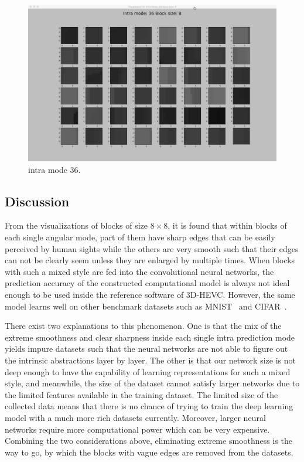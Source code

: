 \begin{figure}[H]
\begin{minipage}{0.49\textwidth}
        \includegraphics[width=\linewidth]{Figures/visu-size8x8/8-36}
        \caption[Intra mode 36]{intra mode 36.}
        \label{fig:size8_mode36}
    \end{minipage}
\end{figure}

\subsection{Discussion}\label{subsec:discussion-about-data-visu}
From the visualizations of blocks of size $8\times8$,
it is found that within blocks of each single angular mode,
part of them have sharp edges that can 
be easily perceived by human sights while the others 
are very smooth such that their edges can not be clearly seem
unless they are enlarged by multiple times.
When blocks with such a mixed style are fed into the 
convolutional neural networks, the prediction accuracy
of the constructed computational model
is always not ideal enough to be used
inside the reference software of 3D-HEVC\@.
However, the same model learns well on other 
benchmark datasets such as 
MNIST~\parencite{XRN001} and CIFAR~\parencite{XRN002}.

There exist two explanations to this phenomenon.
One is that the mix of the extreme smoothness and
clear sharpness inside each single intra prediction mode
yields impure datasets such that the neural networks
are not able to figure out the intrinsic abstractions
layer by layer.
The other is that our network size is not deep enough
to have the capability of learning representations 
for such a mixed style, and meanwhile, the size of 
the dataset cannot satisfy larger networks
due to the limited features available in the 
training dataset.
The limited size of the collected data means that
there is no chance of trying to train the deep learning
model with a much more rich datasets currently.
Moreover, larger neural networks require more 
computational power which can be very expensive.
Combining the two considerations above, 
eliminating extreme smoothness is the way to go,
by which the blocks with vague edges are removed
from the datasets.


